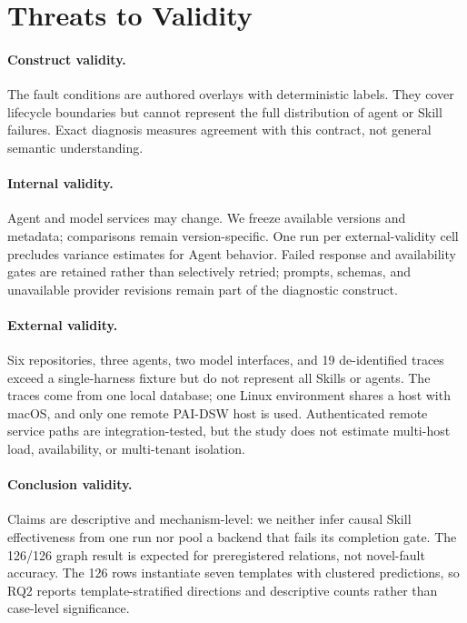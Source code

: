 \documentclass[runningheads]{llncs}
\begin{document}
\section{Threats to Validity}

\paragraph{Construct validity.}
The fault conditions are authored overlays with deterministic labels.  They
cover lifecycle boundaries but cannot represent the full distribution of agent
or Skill failures.  Exact diagnosis measures agreement with this contract, not
general semantic understanding.

\paragraph{Internal validity.}
Agent and model services may change. We freeze available versions and metadata;
comparisons remain version-specific. One run per external-validity cell
precludes variance estimates for Agent behavior. Failed
response and availability gates are retained rather than selectively retried;
prompts, schemas, and unavailable provider revisions remain part of the
diagnostic construct.

\paragraph{External validity.}
Six repositories, three agents, two model interfaces, and 19 de-identified
traces exceed a single-harness fixture but do not represent all Skills or
agents. The traces come from one local database; one Linux environment shares
a host with macOS, and only one remote PAI-DSW host is used. Authenticated
remote service paths are integration-tested, but the study does not estimate
multi-host load, availability, or multi-tenant isolation.

\paragraph{Conclusion validity.}
Claims are descriptive and mechanism-level: we neither infer causal Skill
effectiveness from one run nor pool a backend that fails its completion gate.
The 126/126 graph result is expected for preregistered relations, not
novel-fault accuracy. The 126 rows instantiate seven templates with clustered
predictions, so RQ2 reports template-stratified directions and descriptive
counts rather than case-level significance.
\end{document}
